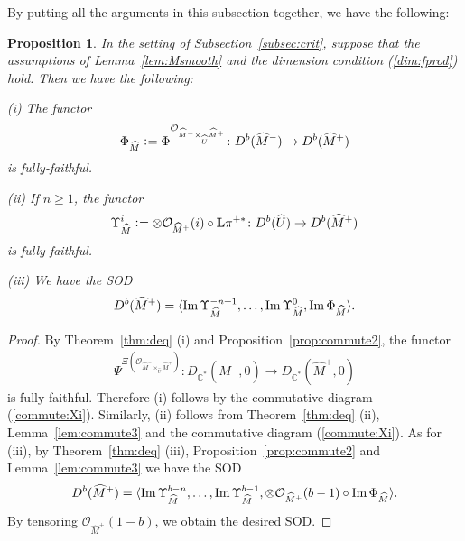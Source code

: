 \documentclass[11pt]{amsart}
\theoremstyle{plain}
\newtheorem{prop}[thm]{Proposition}
\newcommand{\oO}{\mathcal{O}}
\newcommand{\dL}{\mathbf{L}}
\newcommand{\Imm}{\mathop{\rm Im}\nolimits}
\begin{document}
By putting all the arguments in this subsection together, 
we have the following: 
\begin{prop}\label{cor:sod}
In the setting of Subsection~\ref{subsec:crit}, 
suppose that the assumptions of Lemma~\ref{lem:Msmooth}
and the dimension condition (\ref{dim:fprod}) hold. 
Then we have the following: 

(i) The functor
\begin{align*}
\Phi_{\widehat{M}} \cneq \Phi^{\oO_{\widehat{M}^{-} \times_{\widehat{U}} \widehat{M}^{+}}} \colon 
D^b(\widehat{M}^{-}) \to D^b(\widehat{M}^{+})
\end{align*}
is fully-faithful. 

(ii) If $n\ge 1$, the functor
\begin{align*}
\Upsilon_{\widehat{M}}^i 
\cneq 
\otimes \oO_{\widehat{M}^+}(i) \circ \dL \pi^{+\ast}
 \colon 
D^b(\widehat{U}) \to D^b(\widehat{M}^+)
\end{align*}
is fully-faithful. 

(iii) We have the SOD
\begin{align*}
D^b(\widehat{M}^{+})=\langle \Imm \Upsilon_{\widehat{M}}^{-n+1}, \ldots, 
\Imm \Upsilon_{\widehat{M}}^0, \Imm \Phi_{\widehat{M}}   \rangle. 
\end{align*}
\end{prop}
\begin{proof}
By Theorem~\ref{thm:deq} (i) and
Proposition~\ref{prop:commute2}, 
the functor
\begin{align*}
\Psi^{\Xi(\oO_{\widehat{M}^{-} \times_{\widehat{U}} \widehat{M}^{+}})} \colon 
D_{\mathbb{C}^{\ast}}(\widehat{M}^{-}, 0) \to 
D_{\mathbb{C}^{\ast}}(\widehat{M}^{+}, 0)
\end{align*}
is fully-faithful. 
Therefore 
(i) follows 
by the commutative diagram (\ref{commute:Xi}). 
Similarly, 
(ii) follows from Theorem~\ref{thm:deq} (ii), 
Lemma~\ref{lem:commute3}
and the commutative diagram (\ref{commute:Xi}). 
As for (iii), 
by Theorem~\ref{thm:deq} (iii), Proposition~\ref{prop:commute2}
and Lemma~\ref{lem:commute3} we have the SOD
\begin{align*}
D^b(\widehat{M}^{+})=
\langle \Imm \Upsilon_{\widehat{M}}^{b-n}, \ldots, 
\Imm \Upsilon_{\widehat{M}}^{b-1}, 
\otimes \oO_{\widehat{M}^{+}}(b-1) \circ \Imm 
\Phi_{\widehat{M}}
 \rangle. 
\end{align*}
By tensoring $\oO_{\widehat{M}^{+}}(1-b)$, we obtain the desired SOD. 
\end{proof}
\end{document}
